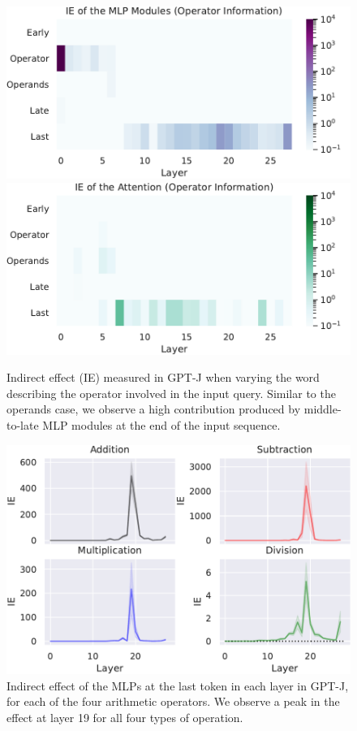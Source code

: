 \documentclass[11pt]{article}
\begin{document}
\begin{figure}[t]
    \centering
    \includegraphics[width=0.9\columnwidth]{img/j/j-int3-mlp.pdf}
    \includegraphics[width=0.9\columnwidth]{img/j/j-int3-attn.pdf}
    \caption{Indirect effect (IE) measured in GPT-J when varying the word describing the operator involved in the input query. Similar to the operands case, we observe a high contribution produced by middle-to-late MLP modules at the end of the input sequence.}
    \label{fig:operator}
\end{figure}



\begin{figure}[t]
    \centering
    \includegraphics[width=\columnwidth]{img/j/operations.pdf}
    \caption{Indirect effect of the MLPs at the last token in each layer in GPT-J, for each of the four arithmetic operators. We observe a peak in the effect at layer 19 for all four types of operation.}
    \label{fig:gptj-int1}
\end{figure}
\end{document}
